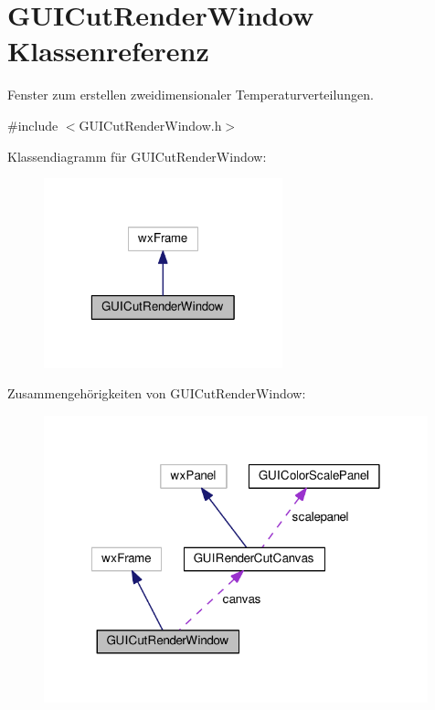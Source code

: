 \hypertarget{classGUICutRenderWindow}{\section{G\-U\-I\-Cut\-Render\-Window Klassenreferenz}
\label{classGUICutRenderWindow}
}


Fenster zum erstellen zweidimensionaler Temperaturverteilungen.  




{\ttfamily \#include $<$G\-U\-I\-Cut\-Render\-Window.\-h$>$}



Klassendiagramm für G\-U\-I\-Cut\-Render\-Window\-:\nopagebreak
\begin{figure}[H]
\begin{center}
\leavevmode
\includegraphics[width=196pt]{classGUICutRenderWindow__inherit__graph}
\end{center}
\end{figure}


Zusammengehörigkeiten von G\-U\-I\-Cut\-Render\-Window\-:\nopagebreak
\begin{figure}[H]
\begin{center}
\leavevmode
\includegraphics[width=315pt]{classGUICutRenderWindow__coll__graph}
\end{center}
\end{figure}
